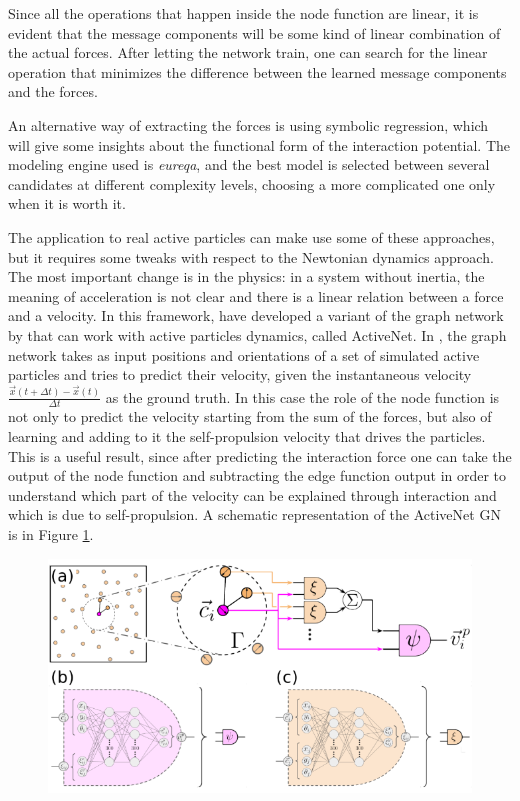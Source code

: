 \documentclass[../../master_thesis_np.tex]{subfiles}
\begin{document}
	Since all the operations that happen inside the node function are linear, it is evident that the message components will be some kind of linear combination of the actual forces. 
	After letting the network train, one can search for the linear operation that minimizes the difference between the learned message components and the forces. 
	
	An alternative way of extracting the forces is using symbolic regression, which will give some insights about the functional form of the interaction potential. 
	The modeling engine used is \emph{eureqa}, and the best model is selected between several candidates at different complexity levels, choosing a more complicated one only when it is worth it.
	
	The application to real active particles can make use some of these approaches, but it requires some tweaks with respect to the Newtonian dynamics approach. 
	The most important change is in the physics: in a system without inertia, the meaning of acceleration is not clear and there is a linear relation between a force and a velocity. 
	In this framework, \citeauthor{ruiz-garcia_discovering_2024} have developed a variant of the graph network by \citeauthor{cranmer_discovering_2020} that can work with active particles dynamics, called ActiveNet. 
	In \cite{ruiz-garcia_discovering_2024}, the graph network takes as input positions and orientations of a set of simulated active particles and tries to predict their velocity, given the instantaneous velocity $\frac{\vec{x}(t + \Delta t) - \vec{x}(t)}{\Delta t}$ as the ground truth. 
	In this case the role of the node function is not only to predict the velocity starting from the sum of the forces, but also of learning and adding to it the self-propulsion velocity that drives the particles. 
	This is a useful result, since after predicting the interaction force one can take the output of the node function and subtracting the edge function output in order to understand which part of the velocity can be explained through interaction and which is due to self-propulsion.
	A schematic representation of the ActiveNet GN is in Figure \ref{fig:ruiz1}.
	\begin{figure}[htp]
		\centering
		\includegraphics[width=\singfigwidth]{ruiz1.png}
		\caption{\cite{ruiz-garcia_discovering_2024}}
		\label{fig:ruiz1}
	\end{figure}
\end{document}
